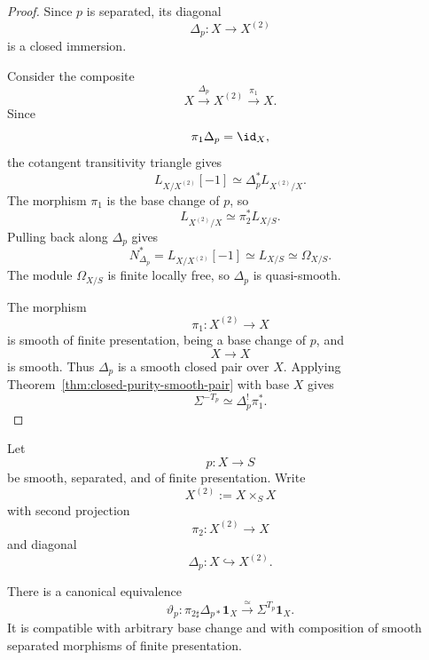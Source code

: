 \begin{proof}
Since \(p\) is separated, its diagonal
\[
    \Delta_p:X\longrightarrow X^{(2)}
\]
is a closed immersion.

Consider the composite
\[
    X
    \xrightarrow{\Delta_p}
    X^{(2)}
    \xrightarrow{\pi_1}
    X.
\]
Since
\[
    \pi_1\Delta_p=\id_X,
\]
the cotangent transitivity triangle gives
\[
    L_{X/X^{(2)}}[-1]
    \simeq
    \Delta_p^*L_{X^{(2)}/X}.
\]
The morphism \(\pi_1\) is the base change of \(p\), so
\[
    L_{X^{(2)}/X}
    \simeq
    \pi_2^*L_{X/S}.
\]
Pulling back along \(\Delta_p\) gives
\[
    N^*_{\Delta_p}
    =
    L_{X/X^{(2)}}[-1]
    \simeq
    L_{X/S}
    \simeq
    \Omega_{X/S}.
\]
The module \(\Omega_{X/S}\) is finite locally free, so \(\Delta_p\) is
quasi-smooth.

The morphism
\[
    \pi_1:X^{(2)}\longrightarrow X
\]
is smooth of finite presentation, being a base change of \(p\), and
\[
    X\longrightarrow X
\]
is smooth.  Thus \(\Delta_p\) is a smooth closed pair over \(X\).
Applying Theorem~\ref{thm:closed-purity-smooth-pair} with base \(X\) gives
\[
    \Sigma^{-T_p}
    \simeq
    \Delta_p^!\pi_1^*.
\]
\end{proof}

\begin{corollary}
\label{cor:coherent-diagonal-thom}
Let
\[
    p:X\longrightarrow S
\]
be smooth, separated, and of finite presentation.  Write
\[
    X^{(2)}:=X\times_SX
\]
with second projection
\[
    \pi_2:X^{(2)}\longrightarrow X
\]
and diagonal
\[
    \Delta_p:X\hookrightarrow X^{(2)}.
\]

There is a canonical equivalence
\[
    \vartheta_p:
    \pi_{2\sharp}\Delta_{p*}\mathbf1_X
    \xrightarrow{\simeq}
    \Sigma^{T_p}\mathbf1_X.
\]
It is compatible with arbitrary base change and with composition of smooth
separated morphisms of finite presentation.
\end{corollary}

